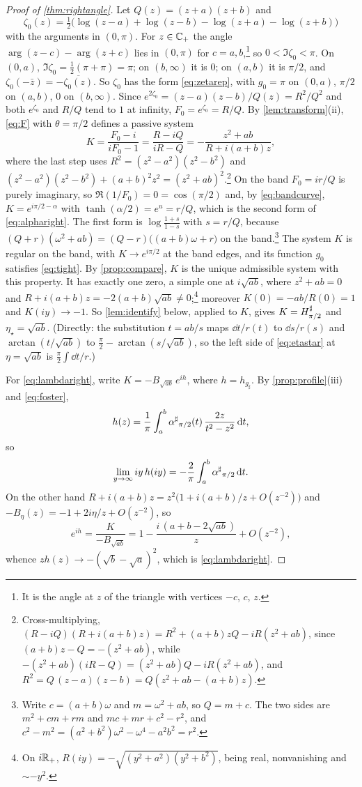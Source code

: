 \begin{proof}[Proof of \cref{thm:rightangle}]
Let $Q(z)=(z+a)(z+b)$ and
\[
\zeta_0(z)=\tfrac12\big(\log(z-a)+\log(z-b)-\log(z+a)-\log(z+b)\big)
\]
with the arguments in $(0,\pi)$. For $z\in\mathbb C_{+}$ the angle $\arg(z-c)-\arg(z+c)$
lies in $(0,\pi)$ for $c=a,b$,\footnote{It is the angle at $z$ of the
triangle with vertices $-c$, $c$, $z$.} so $0<\Im\zeta_0<\pi$. On $(0,a)$,
$\Im\zeta_0=\frac12(\pi+\pi)=\pi$; on $(b,\infty)$ it is $0$; on $(a,b)$ it is
$\pi/2$, and $\zeta_0(-\bar z)=-\overline{\zeta_0(z)}$. So $\zeta_0$ has the form
\eqref{eq:zetarep}, with $g_0=\pi$ on $(0,a)$, $\pi/2$ on $(a,b)$, $0$ on
$(b,\infty)$. Since $e^{2\zeta_0}=(z-a)(z-b)/Q(z)=R^2/Q^2$ and both $e^{\zeta_0}$
and $R/Q$ tend to $1$ at infinity, $F_0=e^{\zeta_0}=R/Q$. By
\cref{lem:transform}(ii), \eqref{eq:F} with $\theta=\pi/2$ defines a passive
system
\[
K=\frac{F_0-i}{iF_0-1}=\frac{R-iQ}{iR-Q}=-\frac{z^2+ab}{R+i(a+b)z},
\]
where the last step uses $R^2=(z^2-a^2)(z^2-b^2)$ and
$(z^2-a^2)(z^2-b^2)+(a+b)^2z^2=(z^2+ab)^2$.\footnote{Cross-multiplying,
$(R-iQ)(R+i(a+b)z)=R^2+(a+b)zQ-iR(z^2+ab)$, since $(a+b)z-Q=-(z^2+ab)$, while
$-(z^2+ab)(iR-Q)=(z^2+ab)Q-iR(z^2+ab)$, and $R^2=Q\,(z-a)(z-b)=Q(z^2+ab-(a+b)z)$.}
On the band $F_0=ir/Q$ is purely imaginary, so $\Re(1/F_0)=0=\cos(\pi/2)$ and,
by \eqref{eq:bandcurve}, $K=e^{i\pi/2-\alpha}$ with
$\tanh(\alpha/2)=e^{u}=r/Q$, which is the second form of \eqref{eq:alpharight}. The first form is
$\log\frac{1+s}{1-s}$ with $s=r/Q$, because
$(Q+r)(\omega^2+ab)=(Q-r)\big((a+b)\omega+r\big)$ on the band.\footnote{Write
$c=(a+b)\omega$ and $m=\omega^2+ab$, so $Q=m+c$. The two sides are $m^2+cm+rm$ and
$mc+mr+c^2-r^2$, and $c^2-m^2=(a^2+b^2)\omega^2-\omega^4-a^2b^2=r^2$.}
The system $K$ is regular on the band, with $K\to e^{i\pi/2}$ at the band
edges, and its function $g_0$ satisfies \eqref{eq:tight}. By
\cref{prop:compare}, $K$ is the unique admissible system with this property.
It has exactly one zero, a simple one at $i\sqrt{ab}$, where
$z^2+ab=0$ and $R+i(a+b)z=-2(a+b)\sqrt{ab}\ne0$;\footnote{On $i\mathbb R_+$,
$R(iy)=-\sqrt{(y^2+a^2)(y^2+b^2)}$, being real, nonvanishing and $\sim-y^2$.}
moreover $K(0)=-ab/R(0)=1$ and $K(iy)\to-1$. So \cref{lem:identify} below,
applied to $K$, gives $K=H^{\sharp}_{\pi/2}$ and $\eta_\star=\sqrt{ab}$. (Directly: the substitution $t=ab/s$ maps $\dd t/r(t)$
to $\dd s/r(s)$ and $\arctan(t/\sqrt{ab})$ to
$\frac\pi2-\arctan(s/\sqrt{ab})$, so the left side of \eqref{eq:etastar} at
$\eta=\sqrt{ab}$ is $\frac\pi2\int\dd t/r$.)

For \eqref{eq:lambdaright}, write $K=-B_{\sqrt{ab}}\,e^{ih}$, where
$h=h_{g_\sharp}$. By \cref{prop:profile}(iii) and \eqref{eq:foster},
\[
h(z)=\frac1\pi\int_a^b{\alpha^{\sharp}}_{\pi/2}(t)\,\frac{2z}{t^2-z^2}\,\mathrm d t ,
\]
so
\[
\lim_{y\to\infty}iy\,h(iy)=-\frac2\pi\int_a^b{\alpha^{\sharp}}_{\pi/2}\,\mathrm d t .
\]
On the other hand $R+i(a+b)z=z^2\big(1+i(a+b)/z+O(z^{-2})\big)$ and
$-B_\eta(z)=-1+2i\eta/z+O(z^{-2})$, so
\[
e^{ih}=\frac K{-B_{\sqrt{ab}}}=1-\frac{i\,(a+b-2\sqrt{ab})}z+O(z^{-2}),
\]
whence $zh(z)\to-(\sqrt b-\sqrt a)^2$, which is \eqref{eq:lambdaright}.


\end{proof}
